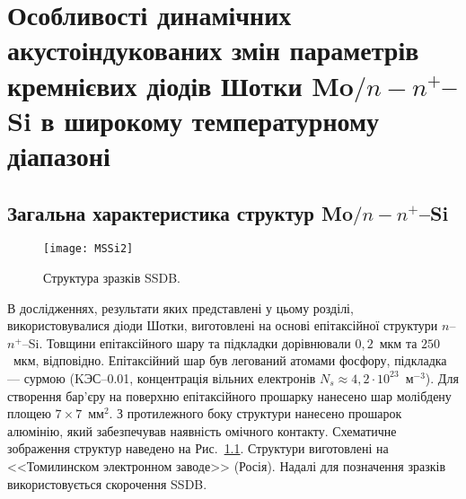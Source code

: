 \documentclass[a4paper,14pt,oneside,openany]{memoir}
\begin{document}







%










%

\chapter{Особливості динамічних акустоіндукованих змін параметрів
кремнієвих діодів Шотки Mo$/n-n^+$--Si в широкому температурному діапазоні\label{Ch_USL_T_SD}}



\section{Загальна характеристика структур Mo$/n-n^+$--Si\label{SSDB:Struc}}



\begin{figure}[b]
\center
\texttt{[image: MSSi2]}%
\caption{\label{figMSSi2}
Структура зразків SSDB.
}
\end{figure}


В дослідженнях, результати яких представлені у цьому розділі, використовувалися діоди Шотки, виготовлені на основі епітаксійної
структури $n$--$n^+$--Si.
Товщини епітаксійного шару та підкладки дорівнювали $0,2$~мкм та $250$~мкм, відповідно.
Епітаксійний шар був легований атомами фосфору, підкладка --- сурмою
(KЭС--0.01, концентрація вільних електронів $N_s\approx4,2\cdot10^{23}$~м$^{-3}$).
Для створення бар'єру на поверхню епітаксійного прошарку нанесено шар молібдену площею $7\times7$~мм$^2$.
З протилежного боку структури нанесено прошарок алюмінію, який забезпечував наявність омічного контакту.
Схематичне зображення структур наведено на Рис.~\ref{figMSSi2}.
Структури виготовлені на <<Томилинском электронном заводе>>  (Росія).
Надалі для позначення зразків використовується скорочення SSDB.
\end{document}
